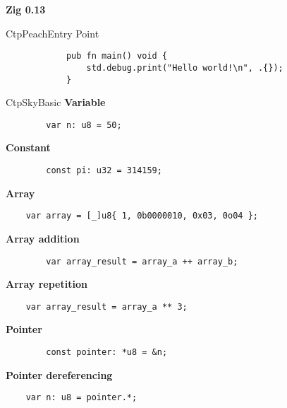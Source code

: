\documentclass[10pt,a4paper]{article}
\begin{document}
	\small
		\begin{multicols*}{3}

		\LARGE\centering\textcolor{CtpPeach}{\textbf{Zig 0.13}}
		\vspace{2cm}
		\normalsize
		\begin{mycolorbox}{CtpPeach}{Entry Point}
			\begin{verbatim}
			pub fn main() void {
				std.debug.print("Hello world!\n", .{});
			}
			\end{verbatim}
		\end{mycolorbox}
\begin{mycolorbox}{CtpSky}{Basic}
	\textbf{Variable}
	\begin{verbatim}
		var n: u8 = 50;
	\end{verbatim}

	\textbf{Constant}
	\begin{verbatim}
		const pi: u32 = 314159;
	\end{verbatim}

	\textbf{Array}
	\begin{verbatim}
	var array = [_]u8{ 1, 0b0000010, 0x03, 0o04 };
	\end{verbatim}

	\textbf{Array addition}
	\begin{verbatim}
		var array_result = array_a ++ array_b;
	\end{verbatim}

	\textbf{Array repetition}
	\begin{verbatim}
	var array_result = array_a ** 3;
	\end{verbatim}

	\textbf{Pointer}
	\begin{verbatim}
		const pointer: *u8 = &n;
	\end{verbatim}

	\textbf{Pointer dereferencing}
	\begin{verbatim}
	var n: u8 = pointer.*;
	\end{verbatim}


\end{mycolorbox}
\end{multicols*}
\end{document}
